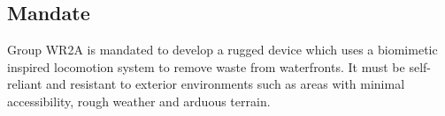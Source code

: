 \subsection{Mandate}

Group WR2A is mandated to develop a rugged device which uses a biomimetic inspired locomotion system to remove waste from waterfronts. It must be self-reliant and resistant to exterior environments such as areas with minimal accessibility, rough weather and arduous terrain.

